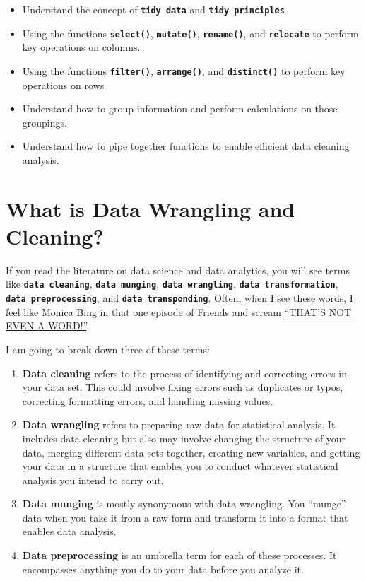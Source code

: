 \documentclass[
]{book}
\begin{document}
\begin{itemize}
\item
  Understand the concept of \textbf{\texttt{tidy\ data}} and \textbf{\texttt{tidy\ principles}}
\item
  Using the functions \textbf{\texttt{select()}}, \textbf{\texttt{mutate()}}, \textbf{\texttt{rename()}}, and \textbf{\texttt{relocate}} to perform key operations on columns.
\item
  Using the functions \textbf{\texttt{filter()}}, \textbf{\texttt{arrange()}}, and \textbf{\texttt{distinct()}} to perform key operations on rows
\item
  Understand how to group information and perform calculations on those groupings.
\item
  Understand how to pipe together functions to enable efficient data cleaning analysis.
\end{itemize}

\section{\texorpdfstring{\textbf{What is Data Wrangling and Cleaning?}}{What is Data Wrangling and Cleaning?}}\label{what-is-data-wrangling-and-cleaning}

If you read the literature on data science and data analytics, you will see terms like \textbf{\texttt{data\ cleaning}}, \textbf{\texttt{data\ munging}}, \textbf{\texttt{data\ wrangling}}, \textbf{\texttt{data\ transformation}}, \textbf{\texttt{data\ preprocessing}}, and \textbf{\texttt{data\ transponding}}. Often, when I see these words, I feel like Monica Bing in that one episode of Friends and scream \href{https://youtu.be/uYM1uQ7QrTc?si=ZPZp2h3CiruqHh-m&t=93}{``THAT'S NOT EVEN A WORD!''}.

I am going to break down three of these terms:

\begin{enumerate}
\def\labelenumi{\arabic{enumi}.}
\item
  \textbf{Data cleaning} refers to the process of identifying and correcting errors in your data set. This could involve fixing errors such as duplicates or typos, correcting formatting errors, and handling missing values.
\item
  \textbf{Data wrangling} refers to preparing raw data for statistical analysis. It includes data cleaning but also may involve changing the structure of your data, merging different data sets together, creating new variables, and getting your data in a structure that enables you to conduct whatever statistical analysis you intend to carry out.
\item
  \textbf{Data munging} is mostly synonymous with data wrangling. You ``munge'' data when you take it from a raw form and transform it into a format that enables data analysis.
\item
  \textbf{Data preprocessing} is an umbrella term for each of these processes. It encompasses anything you do to your data before you analyze it.
\end{enumerate}
\end{document}
